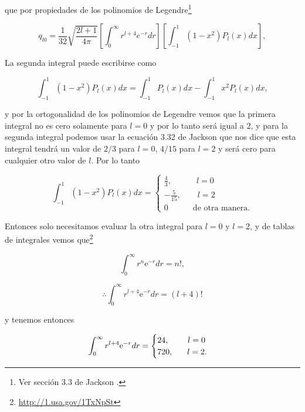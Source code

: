 \documentclass[a4paper,11pt]{article}
\numberwithin{equation}{section}
\newcommand{\euler}{\mathrm{e}}
\begin{document}
que por propiedades de los polinomios de Legendre\footnote{Ver sección 3.3 de 
Jackson \cite{jackson}.}

\begin{equation}
 q_{l0} = \frac{1}{32}\sqrt{\frac{2l+1}{4\pi}}\left[\int_0^\infty r^{l+4}e^{-r} dr \right]
 \left[\int_{-1}^1 (1-x^2)P_l(x)dx \right],
\end{equation}

La segunda integral puede escribirse como 

\begin{equation}
 \int_{-1}^1 (1-x^2)P_l(x)dx = \int_{-1}^1 P_l(x)dx - \int_{-1}^1 x^2P_l(x)dx,
\end{equation}

y por la ortogonalidad de los polinomios de Legendre vemos que la primera integral 
no es cero solamente para $l=0$ y por lo tanto será igual a 2, y para la segunda
integral podemos usar la ecuación 3.32 de Jackson \cite{jackson} que nos dice 
que esta integral tendrá un valor de $2/3$ para $l=0$, $4/15$ para $l=2$ y será 
cero para cualquier otro valor de $l$. Por lo tanto 

\begin{equation}
 \int_{-1}^1 (1-x^2)P_l(x)dx = \begin{cases}
				 \frac{4}{3}, \quad  \qquad l=0 \\
				 -\frac{5}{15}, \quad \quad l=2 \\
				 0 \quad \qquad \text{de otra manera}.
				\end{cases}
\end{equation}

Entonces solo necesitamos evaluar la otra integral para $l=0$ y $l=2$, y de 
tablas de integrales vemos que\footnote{\href{http://1.usa.gov/1TxNpSt}{http://1.usa.gov/1TxNpSt}}

\begin{equation}
 \int_0^\infty r^n \euler^{-r}dr = n!,
\end{equation}

\begin{equation}
\therefore \int_0^\infty r^{l+4} \euler^{-r}dr = (l+4)!
\end{equation}

y tenemos entonces 

\begin{equation}
 \int_0^\infty r^{l+4} \euler^{-r}dr = \begin{cases}
				    24, \hspace{.8cm} l=0 \\
				    720, \hspace{.6cm} l=2.
				\end{cases}
\end{equation}
\end{document}
